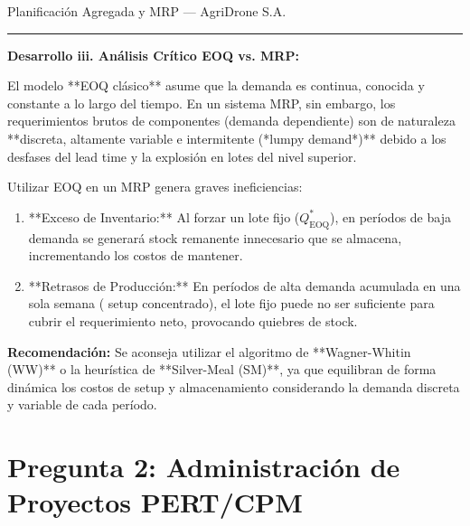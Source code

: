 \documentclass[11pt, a4paper]{article}
\begin{document}
\begin{ejercicio}{Planificación Agregada y MRP --- AgriDrone S.A.}
  \rule{\textwidth}{0.2pt}

  \textbf{Desarrollo iii. Análisis Crítico EOQ vs. MRP:}

  El modelo **EOQ clásico** asume que la demanda es continua, conocida y constante a lo largo del tiempo. En un sistema MRP, sin embargo, los requerimientos brutos de componentes (demanda dependiente) son de naturaleza **discreta, altamente variable e intermitente (*lumpy demand*)** debido a los desfases del lead time y la explosión en lotes del nivel superior.

  Utilizar EOQ en un MRP genera graves ineficiencias:
  \begin{enumerate}
    \item **Exceso de Inventario:** Al forzar un lote fijo ($Q^*_{\text{EOQ}}$), en períodos de baja demanda se generará stock remanente innecesario que se almacena, incrementando los costos de mantener.
    \item **Retrasos de Producción:** En períodos de alta demanda acumulada en una sola semana ( setup concentrado), el lote fijo puede no ser suficiente para cubrir el requerimiento neto, provocando quiebres de stock.
  \end{enumerate}

  \textbf{Recomendación:} Se aconseja utilizar el algoritmo de **Wagner-Whitin (WW)** o la heurística de **Silver-Meal (SM)**, ya que equilibran de forma dinámica los costos de setup y almacenamiento considerando la demanda discreta y variable de cada período.
\end{ejercicio}

\newpage

\section{Pregunta 2: Administración de Proyectos PERT/CPM}
\end{document}
